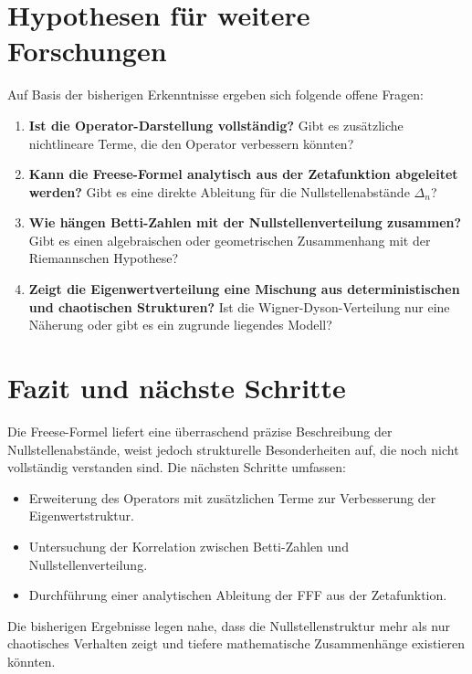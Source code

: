 \documentclass[a4paper,12pt]{article}
\begin{document}
\section{Hypothesen für weitere Forschungen}
Auf Basis der bisherigen Erkenntnisse ergeben sich folgende offene Fragen:

\begin{enumerate}
    \item \textbf{Ist die Operator-Darstellung vollständig?}  
    Gibt es zusätzliche nichtlineare Terme, die den Operator verbessern könnten?

    \item \textbf{Kann die Freese-Formel analytisch aus der Zetafunktion abgeleitet werden?}  
    Gibt es eine direkte Ableitung für die Nullstellenabstände $\Delta_n$?

    \item \textbf{Wie hängen Betti-Zahlen mit der Nullstellenverteilung zusammen?}  
    Gibt es einen algebraischen oder geometrischen Zusammenhang mit der Riemannschen Hypothese?

    \item \textbf{Zeigt die Eigenwertverteilung eine Mischung aus deterministischen und chaotischen Strukturen?}  
    Ist die Wigner-Dyson-Verteilung nur eine Näherung oder gibt es ein zugrunde liegendes Modell?
\end{enumerate}

\section{Fazit und nächste Schritte}
Die Freese-Formel liefert eine überraschend präzise Beschreibung der Nullstellenabstände, weist jedoch strukturelle Besonderheiten auf, die noch nicht vollständig verstanden sind. Die nächsten Schritte umfassen:

\begin{itemize}
    \item Erweiterung des Operators mit zusätzlichen Terme zur Verbesserung der Eigenwertstruktur.
    \item Untersuchung der Korrelation zwischen Betti-Zahlen und Nullstellenverteilung.
    \item Durchführung einer analytischen Ableitung der FFF aus der Zetafunktion.
\end{itemize}

Die bisherigen Ergebnisse legen nahe, dass die Nullstellenstruktur mehr als nur chaotisches Verhalten zeigt und tiefere mathematische Zusammenhänge existieren könnten.
\end{document}
